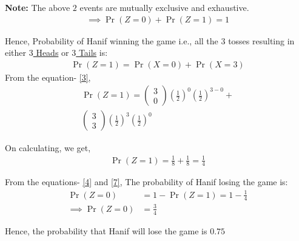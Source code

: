 \documentclass[journal,12pt,twocolumn]{IEEEtran}
\DeclareMathOperator*{\equals}{=}
\providecommand{\pr}[1]{\ensuremath{\Pr\left(#1\right)}}
\providecommand{\brak}[1]{\ensuremath{\left(#1\right)}}
\newcommand{\myvec}[1]{\ensuremath{\begin{pmatrix}#1\end{pmatrix}}}
\newcommand{\note}{\noindent \textbf{Note: }}
\begin{document}
    \note The above $2$ events are mutually exclusive and exhaustive. 
    \begin{align}
        \implies \pr{Z = 0} + \pr{Z = 1} \equals 1 \label{4}
    \end{align}
    
    Hence, Probability of Hanif winning the game i.e., all the $3$ tosses resulting in either \underline{$3$ Heads} or \underline{$3$ Tails} is:
    \begin{align}
        \pr{Z = 1} = \pr{X = 0} + \pr{X = 3}
    \end{align}
    From the equation- \ref{3},
    \begin{multline}
    \pr{Z = 1} = \myvec{3 \\ 0}\brak{\frac{1}{2}}^0\brak{\frac{1}{2}}^{3-0} +\\ \myvec{3 \\ 3}\brak{\frac{1}{2}}^3\brak{\frac{1}{2}}^{0}
    \end{multline}
    
    On calculating, we get,
    \begin{align}
     \label{7}    \pr{Z = 1} = \frac{1}{8} + \frac{1}{8} = \frac{1}{4}
    \end{align}
    
    \noindent From the equations- \ref{4} and \ref{7}, The probability of Hanif losing the game is:
    \begin{align}
        \pr{Z = 0} &= 1 - \pr{Z = 1} = 1- \frac{1}{4}\\
        \implies \pr{Z = 0} &= \frac{3}{4}
    \end{align}
    
    Hence, the probability that Hanif will lose the game is \underline{$0.75$} 
\end{document}
